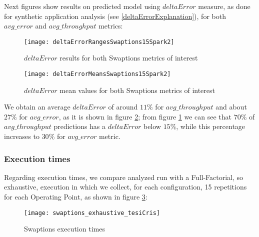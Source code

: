 Next figures show results on predicted model using $deltaError$ measure, as done for synthetic application analysis (see \ref{deltaErrorExplanation}), for both $avg\_error$ and $avg\_throughput$ metrics:





\begin{figure}[h]

    \centering
    \texttt{[image: deltaErrorRangesSwaptions15Spark2]}
    \caption{$deltaError$ results for both Swaptions metrics of interest}
    \label{fig::swaptions15spark2::intervals}
    
\end{figure}

\begin{figure}[h]

    \centering
    \texttt{[image: deltaErrorMeansSwaptions15Spark2]}
    \caption{$deltaError$ mean values for both Swaptions metrics of interest}
    \label{fig::swaptions15spark2::means}
    
\end{figure}





We obtain an average $deltaError$ of around $11\%$ for $avg\_throughput$ and about $27\%$ for $avg\_error$, as it is shown in figure \ref{fig::swaptions15spark2::means}; from figure \ref{fig::swaptions15spark2::intervals} we can see that $70\%$ of $avg\_throughput$ predictions has a $deltaError$ below $15\%$, while this percentage increases to $30\%$ for $avg\_error$ metric.


\subsubsection{Execution times}

Regarding execution times, we compare analyzed run with a Full-Factorial, so exhaustive, execution in which we collect, for each configuration, 15 repetitions for each Operating Point, as shown in figure \ref{fig::sw::execT}:

\begin{figure}[h]

    \centering
    
    \texttt{[image: swaptions\_exhaustive\_tesiCris]}
    
    \caption{Swaptions execution times}
    
    \label{fig::sw::execT}
    
\end{figure}

